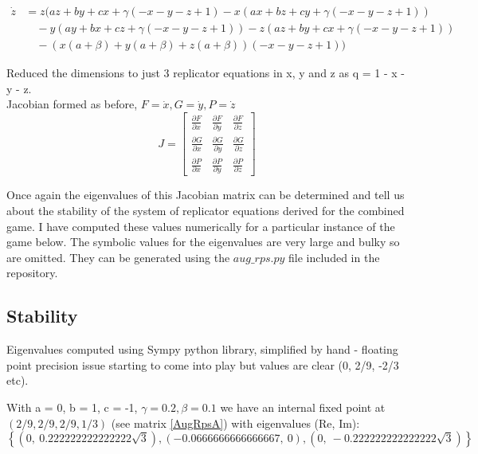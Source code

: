 \documentclass{article}
\begin{document}
\begin{align}
\dot{z} &= z \big(a z + b y + c x + \gamma (-x - y - z + 1)
- x (a x + b z + c y + \gamma (-x - y - z + 1)) \nonumber \\
&\quad - y (a y + b x + c z + \gamma (-x - y - z + 1))
- z (a z + b y + c x + \gamma (-x - y - z + 1)) \nonumber \\
&\quad - (x (a + \beta) + y (a + \beta) + z (a + \beta)) (-x - y - z + 1) \big)
\end{align}

\noindent
Reduced the dimensions to just 3 replicator equations in x, y and z as q = 1 - x - y - z. \\
Jacobian formed as before, $F = \dot{x}, G = \dot{y}, P = \dot{z}$
\[
J = 
\begin{bmatrix}
\frac{\partial F}{\partial x} & \frac{\partial F}{\partial y} &\frac{\partial F}{\partial z} \\[6pt]
\frac{\partial G}{\partial x} & \frac{\partial G}{\partial y} &\frac{\partial G}{\partial z} \\[6pt]
\frac{\partial P}{\partial x} & \frac{\partial P}{\partial y} & \frac{\partial P}{\partial z}
\end{bmatrix}
\]


Once again the eigenvalues of this Jacobian matrix can be determined and tell us about the 
stability of the system of replicator equations derived for the combined game.
I have computed these values numerically for a particular instance of the game below.
The symbolic values for the eigenvalues are very large and bulky so are omitted. They can be generated using the 
$aug\_rps.py$ file included in the repository.


\subsection{Stability}

Eigenvalues computed using Sympy python library, simplified by hand - floating point precision issue starting to come into play but values are clear (0, 2/9, -2/3 etc).


\par
With a = 0, b = 1, c = -1, $\gamma = 0.2, \beta = 0.1$ we have an internal fixed point at $(2/9, 2/9,2/9, 1/3)$ (see matrix \ref{AugRpsA}) with eigenvalues (Re, Im):
\begin{equation}
    \left\{
    ( 0, \  0.222222222222222 \sqrt{3}),
    ( -0.0666666666666667, \  0),
    ( 0, \  - 0.222222222222222 \sqrt{3})
    \right\}
\end{equation}
\end{document}
